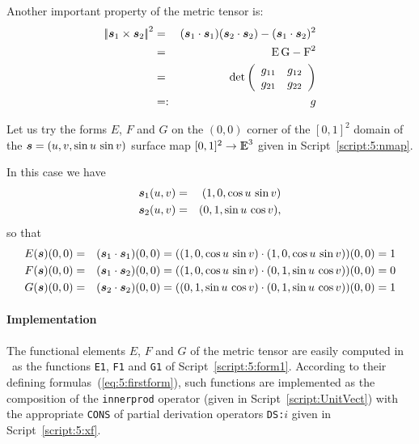 \documentclass{31x47jw}
\begin{document}
Another important property of the metric tensor is:
\begin{eqnarray*}
{\left|\!\left| {\mbox{\boldmath $s$}}_{1} \times {\mbox{\boldmath $s$}}_{2} \right|\!\right|}^{2}
&=& ({\mbox{\boldmath $s$}}_{1}\cdot{\mbox{\boldmath $s$}}_{1})({\mbox{\boldmath $s$}}_{2}\cdot{\mbox{\boldmath $s$}}_{2}) - 
 ({\mbox{\boldmath $s$}}_{1}\cdot{\mbox{\boldmath $s$}}_{2})^{2}\\
&=& \mbox{E}\,\mbox{G} - \mbox{F}^{2}\\
&=& \det {\left(\begin{array}{cccccccc} g_{11} & g_{12} \\ g_{21} & g_{22} \end{array}\right)}\\
&=:& g
\end{eqnarray*}

\begin{example}
    
Let us try the forms $E$, $F$ and $G$ on the $(0,0)$ corner of the
$[0,1]^{2}$ domain of the ${\mbox{\boldmath $s$}} = (u, v, \sin u\,\sin v)$ surface
map $[0,1]^{2}\rightarrow \mathbb{I\!\!E}^{3}$ given in Script~\ref{script:5:nmap}.  

In this case we have 
\begin{eqnarray*}
{\mbox{\boldmath $s$}}_{1}(u,v)&=&(1,0,\cos u\,\sin v)
\\
{\mbox{\boldmath $s$}}_{2}(u,v)&=&(0,1,\sin u\,\cos v),
\end{eqnarray*}
so that
\begin{eqnarray*}
E({\mbox{\boldmath $s$}}) (0,0) &=& ({\mbox{\boldmath $s$}}_{1}\cdot{\mbox{\boldmath $s$}}_{1})(0,0) 
= ((1,0,\cos u\,\sin v)\cdot(1,0,\cos u\,\sin v))(0,0) = 1\\
F({\mbox{\boldmath $s$}}) (0,0) &=& ({\mbox{\boldmath $s$}}_{1}\cdot{\mbox{\boldmath $s$}}_{2})(0,0) = ((1,0,\cos u\,\sin v)
\cdot (0,1,\sin u\,\cos v))(0,0) = 0\\
G({\mbox{\boldmath $s$}}) (0,0) &=& ({\mbox{\boldmath $s$}}_{2}\cdot{\mbox{\boldmath $s$}}_{2})(0,0) 
= ((0,1,\sin u\,\cos v)\cdot(0,1,\sin u\,\cos v))(0,0) = 1
\end{eqnarray*}

\end{example}
    
\paragraph{Implementation}

The functional elements $E$, $F$ and $G$ of the metric tensor are
easily computed in \pl\ as the functions \texttt{E1}, \texttt{F1} and
\texttt{G1} of Script~\ref{script:5:form1}.  According to their
defining formulas~(\ref{eq:5:firstform}), such functions are
implemented as the composition of the \texttt{innerprod} operator
(given in Script~\ref{script:UnitVect}) with the appropriate
\texttt{CONS} of partial derivation operators \texttt{DS:$i$} given in
Script~\ref{script:5:xf}.
\end{document}
